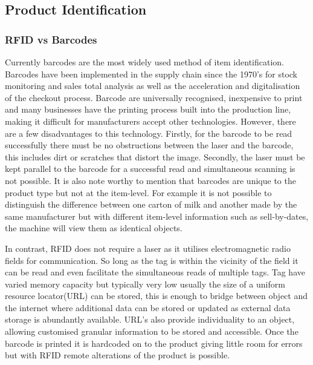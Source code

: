 \documentclass[a4paper, 11pt]{article}
\begin{document}
\vspace{\baselineskip}
\vspace{\baselineskip}
\vspace{\baselineskip}

\subsection{Product Identification}

\subsubsection{RFID vs Barcodes}Currently barcodes are the most widely used method of item identification. Barcodes have been implemented in the supply chain since the 1970's for stock monitoring and sales total analysis as well as the acceleration and digitalisation of the checkout process. Barcode are universally recognised, inexpensive to print and many businesses have the printing process built into the production line, making it difficult for manufacturers accept other technologies. However, there are a few disadvantages to this technology. Firstly, for the barcode to be read successfully there must be no obstructions between the laser and the barcode, this includes dirt or scratches that distort the image. Secondly, the laser must be kept parallel to the barcode for a successful read and simultaneous scanning is not possible. It is also note worthy to mention that barcodes are unique to the product type but not at the item-level. For example it is not possible to distinguish the difference between one carton of milk and another made by the same manufacturer but with different item-level information such as sell-by-dates, the machine will view them as identical objects.

In contrast, RFID does not require a laser as it utilises electromagnetic radio fields for communication. So long as the tag is within the vicinity of the field it can be read and even facilitate the simultaneous reads of multiple tags. Tag have varied memory capacity but typically very low usually the size of a uniform resource locator(URL) can be stored, this is enough to bridge between object and the internet where additional data can be stored or updated as external data storage is abundantly available. URL's also provide individuality to an object, allowing customised granular information to be stored and accessible. Once the barcode is printed it is hardcoded on to the product giving little room for errors but with RFID remote alterations of the product is possible.\cite{georgeR}
\end{document}
